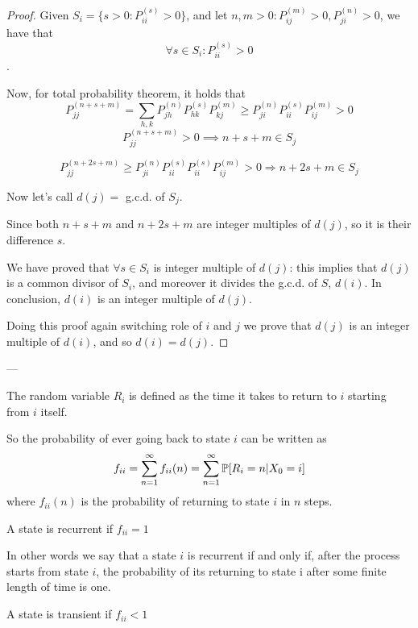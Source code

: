 	\begin{proof}
		Given $S_i = \{ s>0 : P_{ii}^{(s)} >0 \}$, and let $n, m > 0 : P_{ij}^{(m)} > 0, P_{ji}^{(n)} > 0$, we have that $$\forall s \in S_i : P_{ii}^{(s)} > 0$$.

		Now, for total probability theorem, it holds that
		$$ P_{jj}^{(n+s+m)} = \sum\limits_{h, k} P_{jh}^{(n)} P_{hk}^{(s)} P_{kj}^{(m)} \geq P_{ji}^{(n)} P_{ii}^{(s)} P_{ij}^{(m)} >0 $$
		$$ P_{jj}^{(n+s+m)} >0 \implies n+s+m \in S_j$$

		$$P_{jj}^{(n+2s+m)} \geq P_{ji}^{(n)} P_{ii}^{(s)} P_{ii}^{(s)} P_{ij}^{(m)} >0 \Rightarrow n+2s+m \in S_j$$

		Now let's call $d(j) =$ g.c.d. of $S_j$.

		Since both $n+s+m$ and $n+2s+m$ are integer multiples of $d(j)$, so it is their difference $s$.

		We have proved that $\forall s \in S_i$ is integer multiple of $d(j)$: this implies that $d(j)$ is a common divisor of $S_i$, and moreover it divides the g.c.d. of $S$, $d(i)$. In conclusion, $d(i)$ is an integer multiple of $d(j)$.

		Doing this proof again switching role of $i$ and $j$ we prove that $d(j)$ is an integer multiple of $d(i)$, and so $d(i) = d(j)$.
	\end{proof}
	---

	\begin{definition}
		The random variable $R_i$ is defined as the time it takes to return to $i$ starting from $i$ itself.
	\end{definition}

	So the probability of ever going back to state $i$ can be written as
	$$ f_{ii} = \sum\limits_{n=1}^\infty f_{ii}(n)  = \sum\limits_{n=1}^\infty \mathbb{P}[R_i=n | X_0=i] $$
	where $f_{ii}(n)$ is the probability of returning to state $i$ in $n$ steps.

	\begin{definition}
		A state is recurrent if $f_{ii} = 1$
	\end{definition}
	In other words we say that a state $i$ is recurrent if and only if, after the process starts from state $i$, the probability of its returning to state i after some finite length of time is one.

	\begin{definition}
		A state is transient if  $f_{ii} < 1$
	\end{definition}

